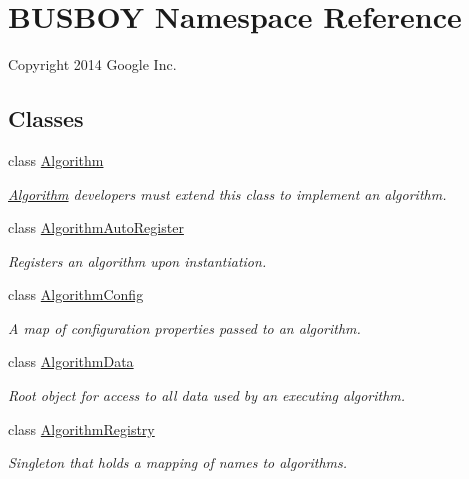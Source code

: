 \hypertarget{namespaceBUSBOY}{
\section{BUSBOY Namespace Reference}
\label{namespaceBUSBOY}
}


Copyright 2014 Google Inc.  
\subsection*{Classes}
\begin{DoxyCompactItemize}
\item 
class \hyperlink{classBUSBOY_1_1Algorithm}{Algorithm}
\begin{DoxyCompactList}\small\item\em \hyperlink{classBUSBOY_1_1Algorithm}{Algorithm} developers must extend this class to implement an algorithm. \item\end{DoxyCompactList}\item 
class \hyperlink{classBUSBOY_1_1AlgorithmAutoRegister}{AlgorithmAutoRegister}
\begin{DoxyCompactList}\small\item\em Registers an algorithm upon instantiation. \item\end{DoxyCompactList}\item 
class \hyperlink{classBUSBOY_1_1AlgorithmConfig}{AlgorithmConfig}
\begin{DoxyCompactList}\small\item\em A map of configuration properties passed to an algorithm. \item\end{DoxyCompactList}\item 
class \hyperlink{classBUSBOY_1_1AlgorithmData}{AlgorithmData}
\begin{DoxyCompactList}\small\item\em Root object for access to all data used by an executing algorithm. \item\end{DoxyCompactList}\item 
class \hyperlink{classBUSBOY_1_1AlgorithmRegistry}{AlgorithmRegistry}
\begin{DoxyCompactList}\small\item\em Singleton that holds a mapping of names to algorithms. \item\end{DoxyCompactList}\item 

\end{DoxyCompactItemize}
